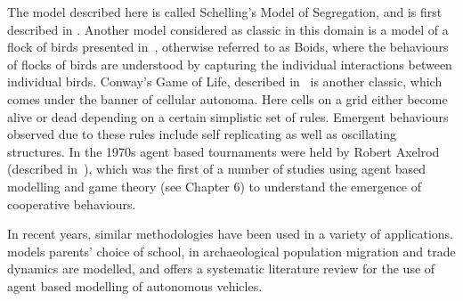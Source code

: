 The model described here is called Schelling's Model of Segregation, and is
first described in \parencite{schelling2006micromotives}. Another model
considered as classic in this domain is a model of a flock of birds presented
in~\parencite{reynolds1987flocks}, otherwise referred to as Boids, where the
behaviours of flocks of birds are understood by capturing the individual
interactions between individual birds. Conway's Game of Life, described
in~\parencite{gardener1970mathematical} is another classic, which comes under
the banner of cellular autonoma. Here cells on a grid either become alive or dead
depending on a certain simplistic set of rules. Emergent behaviours observed due
to these rules include self replicating as well as oscillating structures.
In the 1970s agent based tournaments were held by Robert Axelrod (described
in~\parencite{axelrod1981evolution}), which was the first of a number of studies
using agent based modelling and game theory (see Chapter 6) to understand the
emergence of cooperative behaviours.

In recent years, similar methodologies have been used in a variety of
applications. \parencite{diaz2021agent} models parents' choice of school, in
\parencite{romanowska2019agent} archaeological population migration and trade
dynamics are modelled, and \parencite{jing2020agent} offers a systematic
literature review for the use of agent based modelling of autonomous vehicles.

